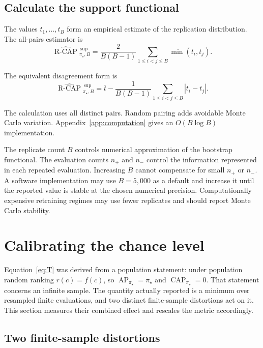 \documentclass[11pt]{article}
\newcommand{\AP}{\operatorname{AP}}
\newcommand{\CAP}{\operatorname{CAP}}
\newcommand{\Tpi}{\CAP_{\pi_\star}}
\newcommand{\RCAPHatB}{\widehat{\operatorname{R\text{-}CAP}}{}^{\,\mathrm{sup}}_{\pi_\star,B}}
\theoremstyle{remark}
\begin{document}
\subsection{Calculate the support functional}

The values $t_1,\ldots,t_B$ form an empirical estimate of the replication distribution. The all-pairs estimator is
\begin{equation}
\RCAPHatB
=
\frac{2}{B(B-1)}
\sum_{1\leq i<j\leq B}
\min(t_i,t_j).
\label{eq:uestimator}
\end{equation}

The equivalent disagreement form is
\begin{equation}
\RCAPHatB
=
\bar t
-
\frac{1}{B(B-1)}
\sum_{1\leq i<j\leq B}
|t_i-t_j|.
\label{eq:uestimator-disagreement}
\end{equation}

The calculation uses all distinct pairs. Random pairing adds avoidable Monte Carlo variation. Appendix~\ref{app:computation} gives an $O(B\log B)$ implementation.

The replicate count $B$ controls numerical approximation of the bootstrap functional. The evaluation counts $n_+$ and $n_-$ control the information represented in each repeated evaluation. Increasing $B$ cannot compensate for small $n_+$ or $n_-$. A software implementation may use $B=5{,}000$ as a default and increase it until the reported value is stable at the chosen numerical precision. Computationally expensive retraining regimes may use fewer replicates and should report Monte Carlo stability.

\section{Calibrating the chance level}
\label{sec:calibration}

Equation~\eqref{eq:T} was derived from a population statement: under population random ranking $r(c)=f(c)$, so $\AP_{\pi_\star}=\pi_\star$ and $\Tpi=0$. That statement concerns an infinite sample. The quantity actually reported is a minimum over resampled finite evaluations, and two distinct finite-sample distortions act on it. This section measures their combined effect and rescales the metric accordingly.

\subsection{Two finite-sample distortions}
\end{document}
